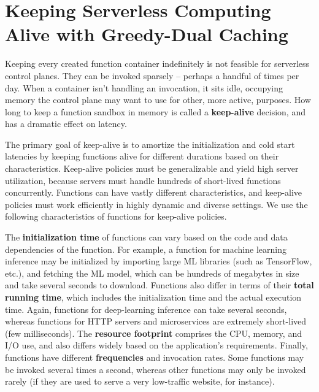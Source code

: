 \chapter{Keeping Serverless Computing Alive with Greedy-Dual Caching}
\label{chap:faascache}

Keeping every created function container indefinitely is not feasible for serverless control planes.
They can be invoked sparsely -- perhaps a handful of times per day.
When a container isn't handling an invocation, it sits idle, occupying memory the control plane may want to use for other, more active, purposes.
How long to keep a function sandbox in memory is called a \textbf{keep-alive} decision, and has a dramatic effect on latency.

The primary goal of keep-alive is to amortize the initialization and cold start latencies by keeping functions alive for different durations based on their characteristics.
Keep-alive policies must be generalizable and yield high server utilization, because servers must handle hundreds of short-lived functions concurrently.
Functions can have vastly different characteristics, and keep-alive policies must work efficiently in highly dynamic and diverse settings.
We use the following characteristics of functions for keep-alive policies.

The \textbf{initialization time} of functions can vary based on the code and data dependencies of the function.  
For example, a function for machine learning inference may be initialized by importing large ML libraries (such as TensorFlow, etc.), and fetching the ML model, which can be hundreds of megabytes in size and take several seconds to download. 
Functions also differ in terms of their \textbf{total running time}, which includes the initialization time and the actual execution time. 
Again, functions for deep-learning inference can take several seconds, whereas functions for HTTP servers and microservices are extremely short-lived (few milliseconds). 
The \textbf{resource footprint} comprises the CPU, memory, and I/O use, and also differs widely based on the application's requirements. 
Finally, functions have different \textbf{frequencies} and invocation rates. Some functions may be invoked several times a second, whereas other functions may only be invoked rarely (if they are used to serve a very low-traffic website, for instance). 






